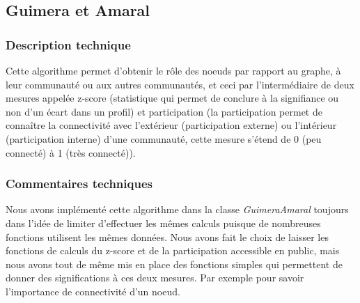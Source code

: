 \begin{titlepage}
{\subsection{Guimera et Amaral}
\subsubsection{Description technique}
{
Cette algorithme permet d'obtenir le rôle des noeuds par rapport au graphe, à leur communauté ou aux autres communautés, et ceci par l'intermédiaire de deux mesures appelée z-score (statistique qui permet de conclure à la signifiance ou non d'un écart dans un profil) et participation (la participation permet de connaître la connectivité avec l'extérieur (participation externe) ou l'intérieur (participation interne) d'une communauté, cette mesure s'étend de 0 (peu connecté) à 1 (très connecté)).
}
\subsubsection{Commentaires techniques}
{
Nous avons implémenté cette algorithme dans la classe \textit{GuimeraAmaral} toujours dans l'idée de limiter d'effectuer les mêmes calculs puisque de nombreuses fonctions utilisent les mêmes données. Nous avons fait le choix de laisser les fonctions de calculs du z-score et de la participation accessible en public, mais nous avons tout de même mis en place des fonctions simples qui permettent de donner des significations à ces deux mesures. Par exemple pour savoir l'importance de connectivité d'un noeud.
}
}
\end{titlepage}
